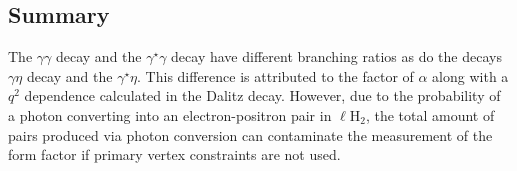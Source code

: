  \subsection{Summary}
 The $\gamma \gamma$ decay and the $\gamma^\star \gamma$ decay have different branching ratios as do the decays $\gamma \eta$ decay and the $\gamma^\star \eta$. This difference is attributed to the factor of $\alpha$ along with a $q^2$ dependence calculated in the Dalitz decay. However, due to the probability of a photon converting into an electron-positron pair in $\ell$H$_2$, the total amount of \epemT pairs produced via photon conversion can contaminate the measurement of the form factor if primary vertex constraints are not used.